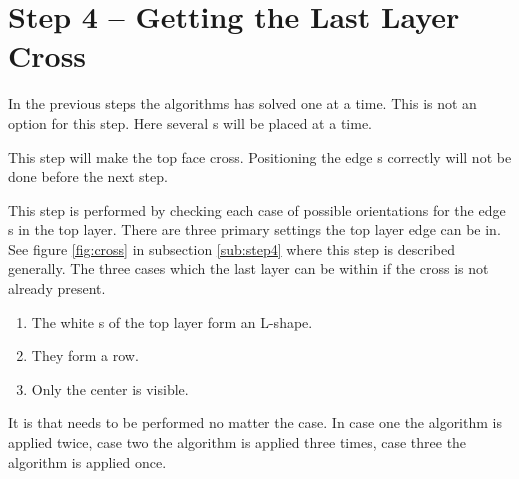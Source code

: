 \section{Step 4 --  Getting the Last Layer Cross}
In the previous steps the algorithms has solved one \cpiece{} at a time. 
This is not an option for this step. 
Here several \cpiece{}s will be placed at a time. 

This step will make the top face cross. 
Positioning the edge \cpiece{}s correctly will not be done before the next step. 

This step is performed by checking each case of possible orientations for the edge \cpiece{}s in the top layer. 
There are three primary settings the top layer edge \cpiece{} can be in. See figure \ref{fig:cross} in subsection \ref{sub:step4} where this step is described generally.
The three cases which the last layer can be within if the cross is not already present.
\begin{enumerate}
\item The white \facelet{}s of the top layer form an L-shape.
\item They form a row.
\item Only the center \facelet{} is visible. 
\end{enumerate}
It is  that needs to be performed no matter the case. In case one the algorithm is applied twice, case two the algorithm is applied three times, case three the algorithm is applied once.